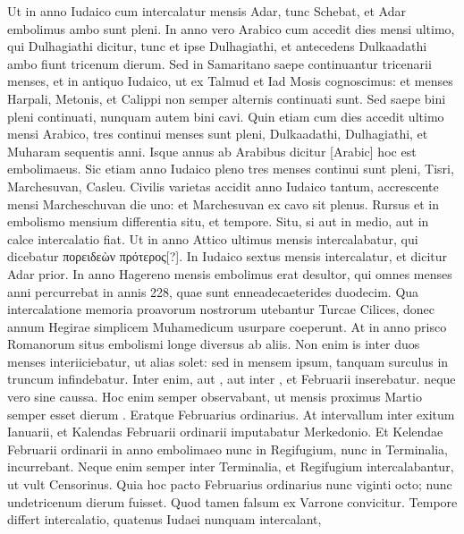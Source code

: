 Ut in anno Iudaico cum intercalatur mensis Adar, tunc
Schebat, et Adar embolimus ambo sunt pleni.
In anno vero Arabico
cum accedit dies mensi ultimo, qui Dulhagiathi dicitur, tunc et ipse
Dulhagiathi, et antecedens Dulkaadathi ambo fiunt tricenum dierum.
Sed in Samaritano saepe continuantur tricenarii menses, et in antiquo
Iudaico, ut ex Talmud et Iad Mosis cognoscimus: et menses Harpali,
Metonis, et Calippi non semper alternis continuati sunt.
Sed saepe bini
pleni continuati, nunquam autem bini cavi.
Quin etiam cum dies accedit
ultimo mensi Arabico, tres continui menses sunt pleni, Dulkaadathi,
Dulhagiathi, et Muharam sequentis anni.
Isque annus ab Arabibus
dicitur \textarabic{}[Arabic] hoc est embolimaeus.
Sic etiam anno Iudaico pleno
tres menses continui sunt pleni, Tisri, Marchesuvan, Casleu.
Civilis
varietas accidit anno Iudaico tantum, accrescente mensi Marcheschuvan
die uno: et Marchesuvan ex cavo sit plenus.
Rursus et in embolismo
mensium differentia situ, et tempore.
Situ, si aut in medio, aut in calce
intercalatio fiat.
Ut in anno Attico ultimus mensis intercalabatur, qui
dicebatur \textgreek{πορειδεὼν πρότερος[?]}.
In Iudaico sextus mensis intercalatur, et
dicitur Adar prior.
In anno Hagereno mensis embolimus erat desultor,
qui omnes menses anni percurrebat in annis 228, quae sunt enneadecaeterides
duodecim.
Qua intercalatione memoria proavorum nostrorum
utebantur Turcae Cilices, donec annum Hegirae simplicem
Muhamedicum usurpare coeperunt.
At in anno prisco Romanorum
situs embolismi longe diversus ab aliis.
Non enim is inter duos
menses interiiciebatur, ut alias solet: sed in mensem ipsum, tanquam
surculus in truncum infindebatur.
Inter  enim, aut ,
aut inter , et  Februarii inserebatur.
neque vero sine caussa.
Hoc enim semper observabant, ut mensis proximus Martio semper esset
dierum .
Eratque Februarius ordinarius.
At intervallum inter exitum
Ianuarii, et Kalendas Februarii ordinarii imputabatur Merkedonio.
Et Kelendae Februarii ordinarii in anno embolimaeo nunc in Regifugium,
nunc in Terminalia, incurrebant.
Neque enim semper inter
Terminalia, et Regifugium intercalabantur, ut vult Censorinus.
Quia hoc pacto Februarius ordinarius nunc viginti octo; nunc undetricenum
dierum fuisset.
Quod tamen falsum ex Varrone convicitur.
Tempore differt intercalatio, quatenus Iudaei nunquam intercalant,
